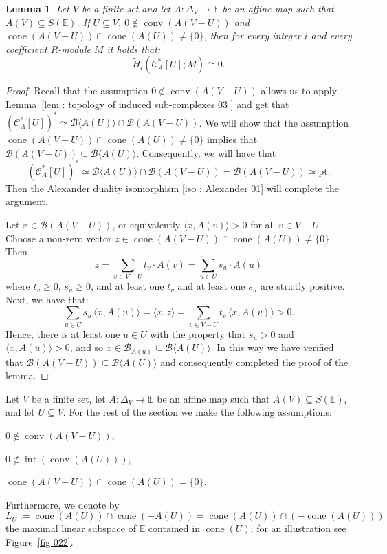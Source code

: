\documentclass[a4paper,11pt,reqno, english]{amsart}
\newtheorem{lemma}[theorem]{Lemma}
\theoremstyle{definition}
\theoremstyle{remark}
\newcommand\CC{\mathscr C}
\newcommand\E{\mathbb{E}}
\newcommand\pt{\mathrm{pt}}
\DeclareMathOperator{\cone}{\mathrm{cone}}
\DeclareMathOperator{\interior}{\mathrm{int}}
\DeclareMathOperator{\conv}{\mathrm{conv}}
\begin{document}
\medskip
\begin{lemma}
	\label{lem : topology of induced sub-complexes 05 }
	Let $V$ be a finite set and let $A\colon \Delta_V\longrightarrow\E$ be an affine map such that $A(V)\subseteq S(\E)$.
	If $U\subseteq V$, $0\notin\conv(A(V-U))$ and $\cone(A(V-U))\cap \cone (A(U))\neq \{0\}$, then for every integer $i$ and every coefficient $R$-module $M$ it holds that:
	\begin{equation}
		\label{eq : dual of dual 05}
		\widetilde{H}_i(\CC_A^*[U];M)\cong 0.
	\end{equation}
\end{lemma}
\begin{proof}
	Recall that the assumption $0\notin\conv(A(V-U))$ allows us to apply Lemma~\ref{lem : topology of induced sub-complexes 03 } and get that $(\CC_A^*[U])^*  \simeq  \mathscr{B}\langle A(U)\rangle\cap \mathscr{B}(A(V-U))$.
	We will show that the assumption $\cone(A(V-U))\cap \cone (A(U))\neq \{0\}$ implies that $\mathscr{B}(A(V-U))\subseteq \mathscr{B}\langle A(U)\rangle$.
	Consequently, we will have that
	\[
		(\CC_A^*[U])^*  \simeq  \mathscr{B}\langle A(U)\rangle\cap \mathscr{B}(A(V-U)) =\mathscr{B}(A(V-U))\simeq\pt.
	\]
	Then the Alexander duality isomorphism \eqref{iso : Alexander 01} will complete the argument.

	\medskip
	Let $x\in \mathscr{B}(A(V-U))$, or equivalently $\langle x,A(v)\rangle>0$ for all $v\in V-U$.
	Choose a non-zero vector $z\in \cone(A(V-U))\cap \cone (A(U))\neq \{0\}$.
	Then
	\[
		z=\sum_{v\in V-U}t_v \cdot A(v)=\sum_{u\in U}s_u \cdot A(u)
	\]
	where $t_v\geq 0$, $s_u\geq 0$, and at least one $t_v$ and at least one $s_u$ are strictly positive.
	Next, we have that:
	\[
		\sum_{u\in U}s_u \,\langle x, A(u)\rangle=\langle x,z\rangle = \sum_{v\in V-U}t_v \,\langle x, A(v)\rangle >0.
	\]
	Hence, there is at least one $u\in U$ with the property that $s_u>0$ and $\langle x,A(u)\rangle>0$, and so $x\in \mathscr{B}_{A(u)}\subseteq \mathscr{B}\langle A(U)\rangle$.
	In this way we have verified that $\mathscr{B}(A(V-U))\subseteq \mathscr{B}\langle A(U)\rangle$ and consequently completed the proof of the lemma.
\end{proof}



\medskip
Let $V$ be a finite set,  let $A\colon \Delta_V\longrightarrow\E$ be an affine map such that $A(V)\subseteq S(\E)$, and let $U\subseteq V$.
For the rest of the section we make the following assumptions:
\begin{compactenum}
	\item[(A1)] 	$0\notin\conv(A(V-U))$,
	\item[(A2)] 	$0\notin\interior(\conv (A(U)))$,
	\item[(A3)] 	 $\cone(A(V-U))\cap \cone (A(U))= \{0\}$.
\end{compactenum}
Furthermore, we denote by \[L_U:=\cone(A(U))\cap\cone(-A(U))=\cone(A(U))\cap(-\cone(A(U)))\] the maximal linear subspace of $\E$ contained in $\cone(U)$; for an illustration see Figure~\ref{fig 022}.
\end{document}
